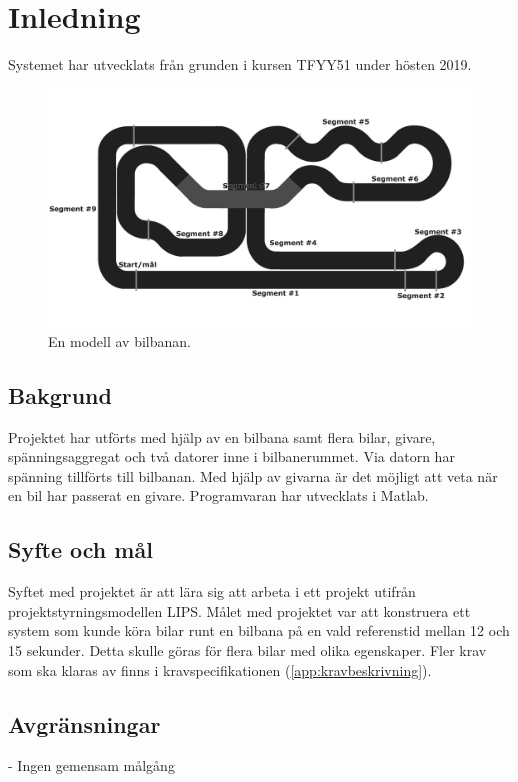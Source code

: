 \section{Inledning}
Systemet har utvecklats från grunden i kursen TFYY51 under hösten 2019.  
\begin{figure}
	\centering
	\includegraphics[width=\linewidth] {Figures/BanaModell}
	\caption{En modell av bilbanan.}
	\label{fig:bilbanan}
\end{figure}

\subsection{Bakgrund} 

Projektet har utförts med hjälp av en bilbana samt flera bilar, givare,
spänningsaggregat och två datorer inne i bilbanerummet. Via datorn har spänning
tillförts till bilbanan. Med hjälp av givarna är det möjligt att veta när en bil
har passerat en givare. Programvaran har utvecklats i Matlab.

\subsection{Syfte och mål}

Syftet med projektet är att lära sig att arbeta i ett projekt utifrån
projektstyrningsmodellen LIPS. Målet med projektet var att konstruera ett system
som kunde köra bilar runt en bilbana på en vald referenstid mellan 12 och 15
sekunder. Detta skulle göras för flera bilar med olika egenskaper. Fler krav som
ska klaras av finns i kravspecifikationen (\ref{app:kravbeskrivning}).

\subsection{Avgränsningar}

- Ingen gemensam målgång
